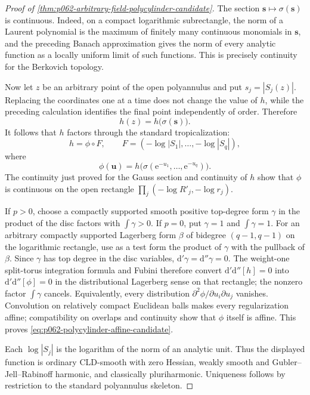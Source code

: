 \begin{proof}[Proof of \cref{thm:p062-arbitrary-field-polycylinder-candidate}]
The section \(\mathbf s\mapsto\sigma(\mathbf s)\) is continuous. Indeed,
on a compact logarithmic subrectangle, the norm of a Laurent polynomial is
the maximum of finitely many continuous monomials in \(\mathbf s\), and
the preceding Banach approximation gives the norm of every analytic
function as a locally uniform limit of such functions. This is precisely
continuity for the Berkovich topology.

Now let \(z\) be an arbitrary point of the open polyannulus and put
\(s_j=|S_j(z)|\). Replacing the coordinates one at a time does not change
the value of \(h\), while the preceding calculation identifies the final
point independently of order. Therefore
\[
                     h(z)=h\bigl(\sigma(\mathbf s)\bigr).
\]
It follows that \(h\) factors through the standard tropicalization:
\begin{equation}\label{eq:p062-polycylinder-factor-candidate}
 h=\phi\circ F,
 \qquad
 F=(-\log|S_1|,\ldots,-\log|S_q|),
\end{equation}
where
\[
             \phi(\mathbf u)
                =h\bigl(\sigma(\mathrm e^{-u_1},\ldots,
                                      \mathrm e^{-u_q})\bigr).
\]
The continuity just proved for the Gauss section and continuity of \(h\)
show that \(\phi\) is continuous on the open rectangle
\(
 \prod_j(-\log R'_j,-\log r_j).
\)

If \(p>0\), choose a compactly supported smooth positive top-degree form
\(\gamma\) in the product of the disc factors with
\(\int\gamma>0\). If \(p=0\), put \(\gamma=1\) and
\(\int\gamma=1\). For an arbitrary compactly supported Lagerberg form
\(\beta\) of bidegree \((q-1,q-1)\) on the logarithmic rectangle, use as
a test form the product of \(\gamma\) with the pullback of \(\beta\).
Since \(\gamma\) has top degree in the disc variables,
\(\mathrm d'\gamma=\mathrm d''\gamma=0\). The weight-one split-torus
integration formula and Fubini therefore convert
\(
 \mathrm d'\mathrm d''[h]=0
\)
into
\(
 \mathrm d'\mathrm d''[\phi]=0
\)
in the distributional Lagerberg sense on that rectangle; the nonzero
factor \(\int\gamma\) cancels. Equivalently,
every distribution
\(
 \partial^2\phi/\partial u_i\partial u_j
\)
vanishes. Convolution on relatively compact Euclidean balls makes every
regularization affine; compatibility on overlaps and continuity show that
\(\phi\) itself is affine. This proves
\eqref{eq:p062-polycylinder-affine-candidate}.

Each \(\log|S_j|\) is the logarithm of the norm of an analytic unit.
Thus the displayed function is ordinary CLD-smooth with zero Hessian,
weakly smooth and Gubler--Jell--Rabinoff harmonic, and classically
pluriharmonic. Uniqueness follows by restriction to the standard
polyannulus skeleton.
\end{proof}
